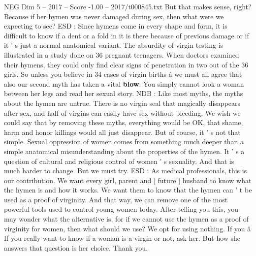 \begin{textsample}{NEG Dim 5 – 2017 – Score -1.00 – 2017/t000845.txt}
But that makes sense, right?
Because if her hymen was never damaged during sex, then what were we expecting to see?
ESD : Since hymens come in every shape and form, it is difficult to know if a dent or a fold in it is there because of previous damage or if it ' s just a normal anatomical variant.
The absurdity of virgin testing is illustrated in a study done on 36 pregnant teenagers.
When doctors examined their hymens, they could only find clear signs of penetration in two out of the 36 girls.
So unless you believe in 34 cases of virgin births â we must all agree that also our second myth has taken a vital \textbf{blow}.
You simply cannot look a woman between her legs and read her sexual story.
NDB : Like most myths, the myths about the hymen are untrue.
There is no virgin seal that magically disappears after sex, and half of virgins can easily have sex without bleeding.
We wish we could say that by removing these myths, everything would be OK, that shame, harm and honor killings would all just disappear.
But of course, it ' s not that simple.
Sexual oppression of women comes from something much deeper than a simple anatomical misunderstanding about the properties of the hymen.
It ' s a question of cultural and religious control of women ' s sexuality.
And that is much harder to change.
But we must try.
ESD : As medical professionals, this is our contribution.
We want every girl, parent and [ future ] husband to know what the hymen is and how it works.
We want them to know that the hymen can ' t be used as a proof of virginity.
And that way, we can remove one of the most powerful tools used to control young women today.
After telling you this, you may wonder what the alternative is, for if we cannot use the hymen as a proof of virginity for women, then what should we use?
We opt for using nothing.
If you â If you really want to know if a woman is a virgin or not, ask her.
But how she answers that question is her choice.
Thank you.

\end{textsample}

